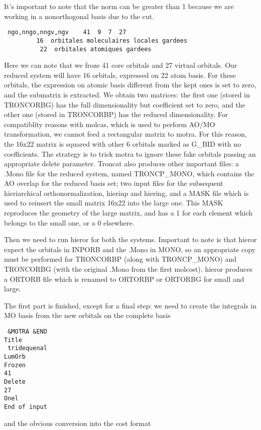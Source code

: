 \documentclass[11pt,a4paper]{article}
\begin{document}
It's important to note that the norm can be greater than 1 because we are
working in a nonorthogonal basis due to the cut.

\begin{verbatim}
 ngo,nngo,nngv,ngv    41  9  7  27
         16  orbitales moleculaires locales gardees
          22  orbitales atomiques gardees
\end{verbatim}

Here we can note that we froze 41 core orbitals and 27 virtual orbitals. Our
reduced system will have 16 orbitals, expressed on 22 atom basis. 
For these orbitals, the expression on atomic basis different from the kept
ones is set to zero, and the submatrix is extracted. We obtain two
matrices: the first one (stored in TRONCORBG) has the full dimensionality
but coefficient set to zero, and the other one (stored in TRONCORBP) has the
reduced dimensionality.
For compatiblity reasons with molcas, which is used to perform AO/MO
transformation, we cannot feed a rectangular matrix to motra. For this
reason, the 16x22 matrix is squared with other 6 orbitals marked as G\_BID
with no coefficients. The strategy is to trick motra to ignore these fake
orbitals passing an appropriate delete parameter.
Troncat also produces other important files: a .Mono file for the reduced
system, named TRONCP\_MONO, which contains the AO overlap for the reduced
basis set; two input files for the subsequent hieriarchical
orthonormalization, hierinp and hiering, and a MASK file which is used to
reinsert the small matrix 16x22 into the large one. This MASK reproduces the
geometry of the large matrix, and has a 1 for each element which belongs to
the small one, or a 0 elsewhere. 

Then we need to run hieror for both the systems. Important to note is that
hieror expect the orbitals in INPORB and the .Mono in MONO, so an
appropriate copy must be performed for TRONCORBP (along with TRONCP\_MONO)
and TRONCORBG (with the original .Mono from the first molcost). hieror
produces a ORTORB file which is renamed to ORTORBP or ORTORBG for small and
large.

The first part is finished, except for a final step: we need to create the
integrals in MO basis from the new orbitals on the complete basis

\begin{verbatim}
 &MOTRA &END
Title
 tridequenal
LumOrb
Frozen
41
Delete
27
Onel
End of input
\end{verbatim}

and the obvious conversion into the cost format
\end{document}
